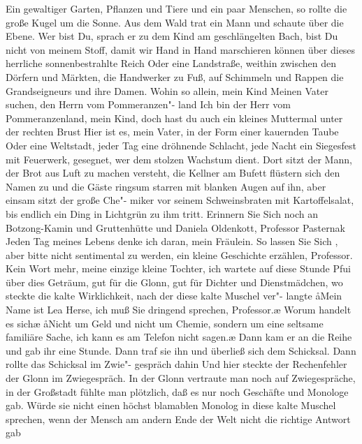 Ein gewaltiger Garten, Pflanzen und Tiere und ein paar
Menschen, so rollte die große Kugel um die Sonne. Aus dem
Wald trat ein Mann und schaute über die Ebene. Wer bist
Du, sprach er zu dem Kind am geschlängelten Bach, bist Du
nicht von meinem Stoff, damit wir Hand in Hand marschieren
können über dieses herrliche sonnenbestrahlte Reich\punkte{}%
\eingriff{eS44-1}{Reich\punkte{} ] Reich~\punkte{}}
Oder eine Landstraße, weithin zwischen den Dörfern und
Märkten, die Handwerker zu Fuß, auf Schimmeln und Rappen
die Grandseigneurs und ihre Damen. Wohin so allein, mein
Kind\frag{} Meinen Vater suchen, den Herrn vom Pommeranzen"-%
land\ausr{} Ich bin der Herr vom Pommeranzenland, mein Kind,
doch hast du auch ein kleines Muttermal unter der rechten
Brust\frag{} Hier ist es, mein Vater, in der Form einer kauernden
Taube\punkte{} Oder eine Weltstadt, jeder Tag eine dröhnende
Schlacht, jede Nacht ein Siegesfest mit Feuerwerk, gesegnet,
wer dem stolzen Wachstum dient. Dort sitzt der Mann, der
Brot aus Luft zu machen versteht, die Kellner am Bufett
flüstern sich den Namen zu und die Gäste ringsum starren
mit blanken Augen auf ihn, aber einsam sitzt der große Che"-%
miker vor seinem Schweinsbraten mit Kartoffelsalat, bis
endlich ein Ding in Lichtgrün zu ihm tritt. Erinnern Sie Sich%
\eingriff{eS44-2}{Sich ] sich}
noch an Botzong-Kamin und Gruttenhütte und Daniela
Oldenkott, Professor Pasternak\frag{} Jeden Tag meines Lebens
denke ich daran, mein Fräulein. So lassen Sie Sich%
\eingriff{eS45-1}{Sich ] sich}%
, aber bitte
nicht sentimental zu werden, ein kleine Geschichte erzählen,
Professor. Kein Wort mehr, meine einzige kleine Tochter,
ich wartete auf diese Stunde\punkte{} Pfui über dies Geträum,
gut für die Glonn, gut für Dichter und Dienstmädchen, wo
steckte die kalte Wirklichkeit, nach der diese kalte Muschel ver"-%
langte\frag{} \aa{}Mein Name ist Lea Herse, ich muß Sie dringend
sprechen, Professor.\ae{} \aanah{}Worum handelt es sich\frag{}\ae{} \aa{}Nicht
um Geld und nicht um Chemie, sondern um eine seltsame familiäre
Sache, ich kann es am Telefon nicht sagen.\ae{} Dann kam er an
die Reihe und gab ihr eine Stunde. Dann traf sie ihn und
überließ sich dem Schicksal. Dann rollte das Schicksal im Zwie"-%
gespräch dahin\punkte{}%
\eingriff{eS45-2}{dahin\punkte{} ] dahin \punkte{}}
Und hier
steckte der Rechenfehler der Glonn\dopp{} im Zwiegespräch. In der Glonn vertraute man noch
auf Zwiegespräche, in der Großstadt fühlte man plötzlich,
daß es nur noch Geschäfte und Monologe gab. Würde sie
nicht einen höchst blamablen Monolog in diese kalte Muschel
sprechen, wenn der Mensch am andern Ende der Welt nicht
die richtige Antwort gab\frag{}

